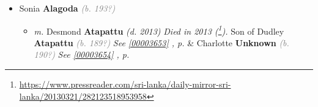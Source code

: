 \documentclass[10pt, openany]{book}
\begin{document}
\begin{itemize}
{\begin{itemize}
{\begin{itemize}
{\begin{itemize}
{{{Resided at 74, Gallage Mawatha, (Kanatte Road), Mirihana, Nugegoda.}}
\begin{itemize}
\item{\textit{m.} Bertrum \textbf{Weerakoon} \textcolor{gray}{\textit{(b. 192?)}} \textcolor{slmaroon}{\textit{Formerly of Valuation Department and State Timber Corporation.
Died in 2006 (\footnote{\url{http://archives.dailynews.lk/2006/01/25/Obituaries.htm}}).
Resided at 74, Kanatta Road, Mirihana, Nugegoda.}} Son of  B A \textbf{Weerakoon} \textcolor{slorange}{\textit{(d. 2006)}} \textcolor{slmaroon}{\textit{Aruppola, Kandy.}} \textcolor{slteal}{\textit{See  \autoref{00003666} \textit{, p. \pageref{00003666} }}}   \label{couple:00003628:00003635} \begin{itemize}
\item{Renuka \textbf{Weerakoon} \textcolor{gray}{\textit{(b. 196?)}}
\begin{itemize}
\item{\textit{m.} Rohan \textbf{Abeywickrema} \textcolor{gray}{\textit{(b. 195?)}}   \label{couple:00003636:00003637} \begin{itemize}
\item{Revantha \textbf{Abeywickrema} \textcolor{gray}{\textit{(b. 198?)}}
 }
\item{Colleen \textbf{Abeywickrema} \textcolor{gray}{\textit{(b. 199?)}}
 }
\end{itemize}}
\end{itemize}
 }
\end{itemize}}
\end{itemize}
   }
\item{Sonia \textbf{Alagoda} \textcolor{gray}{\textit{(b. 193?)}}
\begin{itemize}
\item{\textit{m.} Desmond \textbf{Atapattu} \textcolor{slorange}{\textit{(d. 2013)}} \textcolor{slmaroon}{\textit{Died in 2013 (\footnote{\url{https://www.pressreader.com/sri-lanka/daily-mirror-sri-lanka/20130321/282123518953958}}).}} Son of  Dudley \textbf{Atapattu} \textcolor{gray}{\textit{(b. 189?)}} \textcolor{slteal}{\textit{See  \autoref{00003653} \textit{, p. \pageref{00003653} }}}  \&  Charlotte \textbf{Unknown} \textcolor{gray}{\textit{(b. 190?)}} \textcolor{slteal}{\textit{See  \autoref{00003654} \textit{, p. \pageref{00003654} }}}   \label{couple:00003629:00003642} \begin{itemize}

\end{itemize}}
\end{itemize}}
\end{itemize}}
\end{itemize}}
\end{itemize}}
\end{itemize}
\end{document}
